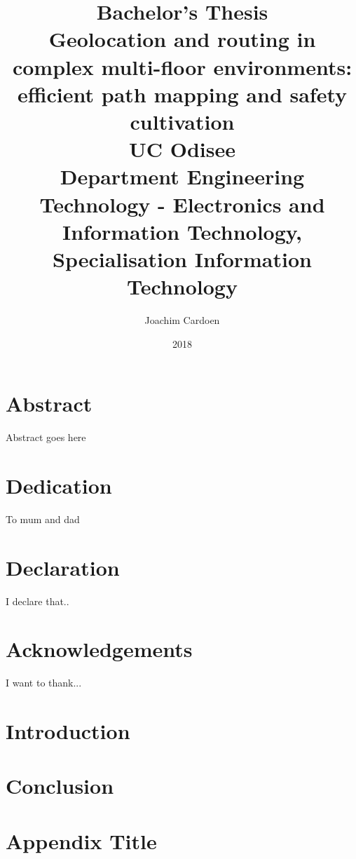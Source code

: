 \documentclass[twoside,12pt]{report}
\title{
    {\large Bachelor's Thesis}\\
    {Geolocation and routing in complex multi-floor environments: efficient path mapping and safety cultivation}\\
    {\large UC Odisee}\\
    {\large Department Engineering Technology - Electronics and Information Technology, Specialisation Information Technology}\\
}
\author{Joachim Cardoen}
\date{2018}
\begin{document}
\maketitle

\pagestyle{empty}


\chapter*{Abstract}
Abstract goes here

\chapter*{Dedication}
To mum and dad

\chapter*{Declaration}
I declare that..

\chapter*{Acknowledgements}
I want to thank...

\tableofcontents

\chapter{Introduction}


\chapter{Conclusion}


\appendix
\chapter{Appendix Title}

\end{document}
